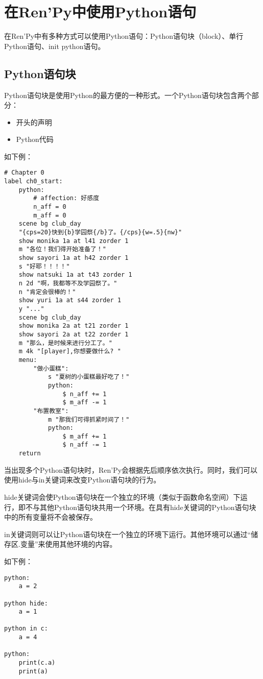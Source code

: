\section{在Ren'Py中使用Python语句}
\label{sec:4.3}
在Ren'Py中有多种方式可以使用Python语句：Python语句块（block）、单行Python语句、init python语句。

\subsection{Python语句块}
Python语句块是使用Python的最方便的一种形式。一个Python语句块包含两个部分：
\begin{itemize}
    \item 开头的声明
    \item Python代码
\end{itemize}

如下例：

\begin{lstlisting}
# Chapter 0
label ch0_start:
    python:
        # affection: 好感度
        n_aff = 0
        m_aff = 0
    scene bg club_day
    "{cps=20}快到{b}学园祭{/b}了。{/cps}{w=.5}{nw}"
    show monika 1a at l41 zorder 1
    m "各位！我们得开始准备了！"
    show sayori 1a at h42 zorder 1
    s "好耶！！！！"
    show natsuki 1a at t43 zorder 1
    n 2d "啊，我都等不及学园祭了。"
    n "肯定会很棒的！"
    show yuri 1a at s44 zorder 1
    y "..."
    scene bg club_day
    show monika 2a at t21 zorder 1
    show sayori 2a at t22 zorder 1
    m "那么，是时候来进行分工了。"
    m 4k "[player],你想要做什么? "
    menu:
        "做小蛋糕":
            s "夏树的小蛋糕最好吃了！"
            python:
                $ n_aff += 1
                $ m_aff -= 1
        "布置教室":
            m "那我们可得抓紧时间了！"
            python:
                $ m_aff += 1
                $ n_aff -= 1
    return

\end{lstlisting}

当出现多个Python语句块时，Ren'Py会根据先后顺序依次执行。同时，我们可以使用hide与in关键词来改变Python语句块的行为。

hide关键词会使Python语句块在一个独立的环境（类似于函数命名空间）下运行，即不与其他Python语句块共用一个环境。在具有hide关键词的Python语句块中的所有变量将不会被保存。

in关键词则可以让Python语句块在一个独立的环境下运行。其他环境可以通过“储存区.变量”来使用其他环境的内容。

如下例：
\begin{lstlisting}
python:
    a = 2

python hide:
    a = 1

python in c:
    a = 4

python:
    print(c.a)
    print(a)
\end{lstlisting}

